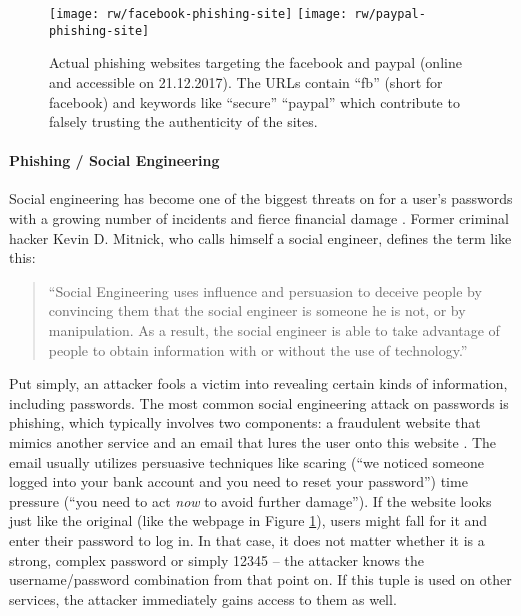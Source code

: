 \begin{figure}
	\centering
	\texttt{[image: rw/facebook-phishing-site]}
	\texttt{[image: rw/paypal-phishing-site]}
	\caption{\label{fig:rw:phishingsite} Actual phishing websites targeting the facebook and paypal (online and accessible on 21.12.2017). The URLs contain ``fb'' (short for facebook) and keywords like ``secure'' ``paypal'' which contribute to falsely trusting the authenticity of the sites.}
\end{figure}

\paragraph{Phishing / Social Engineering} Social engineering has become one of the biggest threats on for a user's passwords with a growing number of incidents and fierce financial damage \cite{BKA2016Bundeslagebild}. Former criminal hacker Kevin D. Mitnick, who calls himself a social engineer, defines the term like this:
\begin{quotation}
	``Social Engineering uses influence and persuasion to deceive people
	by convincing them that the social engineer is someone he is not,
	or by manipulation. As a result, the social engineer is able to take
	advantage of people to obtain information with or without the use of
	technology.'' \cite[Frontmatter]{Mitnick2003ArtOfDeception}
\end{quotation}
Put simply, an attacker fools a victim into revealing certain kinds of information, including passwords. The most common social engineering attack on passwords is phishing, which typically involves two components: a fraudulent website that mimics another service and an email that lures the user onto this website \cite{Dhamija2006WhyPhishingWorks,Sheng2010WhoFallsForAPhish}. The email usually utilizes persuasive techniques like scaring  (``we noticed someone logged into your bank account and you need to reset your password'') time pressure (``you need to act \textit{now} to avoid further damage''). If the website looks just like the original (like the webpage in Figure \ref{fig:rw:phishingsite}), users might fall for it and enter their password to log in. In that case, it does not matter whether it is a strong, complex password or simply 12345 -- the attacker knows the username/password combination from that point on. If this tuple is used on other services, the attacker immediately gains access to them as well. 

